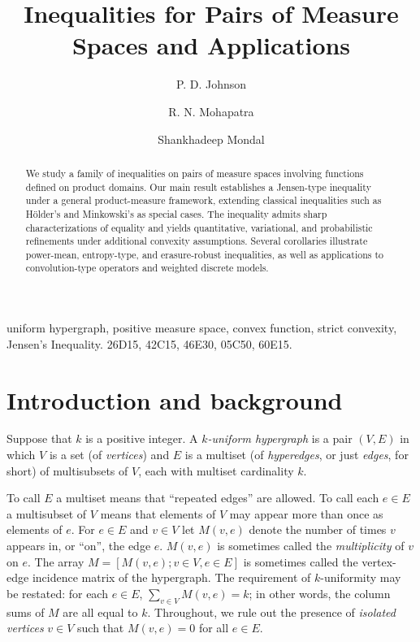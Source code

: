 \documentclass[final,1p,times]{elsarticle}
\begin{document}
\begin{frontmatter}
		\title{ Inequalities for Pairs of Measure Spaces and Applications }
        \author{P. D. Johnson}
		\author{R. N. Mohapatra}
		\author{Shankhadeep Mondal}
		
		
		\address{Department of Mathematics and Statistics, Auburn University, Auburn, AL-36849 }
       \address{School of Mathematics, University of Central Florida, Orlando, Florida-32816}
        \address{School of Mathematics, University of Central Florida, Orlando, Florida-32816}
		
\begin{abstract}
We study a family of inequalities on pairs of measure spaces involving functions defined on product domains. Our main result establishes a Jensen-type inequality under a general product-measure framework, extending classical inequalities such as H\"older’s and Minkowski’s as special cases. The inequality admits sharp characterizations of equality
and yields quantitative, variational, and probabilistic refinements under additional convexity assumptions. Several corollaries illustrate power-mean, entropy-type, and erasure-robust inequalities, as well as applications to convolution-type operators and weighted discrete models.
\end{abstract}


\begin{keyword}
uniform hypergraph, positive measure space, convex function, strict convexity, Jensen's Inequality.
\MSC[2010] 26D15, 42C15, 46E30, 05C50, 60E15.
\end{keyword}

\end{frontmatter}








\section{Introduction and background}

Suppose that $k$ is a positive integer.  A {\em $k$-uniform hypergraph} is a pair $(V, E)$ in which $V$ is a set (of {\em vertices}) and $E$ is a multiset (of {\em hyperedges}, or just {\em edges}, for short) of multisubsets of $V$, each with multiset cardinality $k$.

To call $E$ a multiset means that ``repeated edges'' are allowed.  To call each $e \in E$ a multisubset of $V$ means that elements of $V$ may appear more than once as elements of $e$.  For $e \in E$ and $v \in V$ let $M(v, e)$ denote the number of times $v$ appears in, or ``on'', the edge $e$.  $M(v, e)$ is sometimes called the {\em multiplicity} of $v$ on $e$.  The array $M = [M(v, e); v \in V, e \in E]$ is sometimes called the vertex-edge incidence matrix of the hypergraph.  The requirement of $k$-uniformity may be restated: for each $e \in E$, $\sum _{v \in V} M(v, e) = k$; in other words, the column sums of $M$ are all equal to $k$.  Throughout, we rule out the presence of {\em isolated vertices} $v \in V$ such that $M(v, e) = 0$ for all $e \in E$.
\end{document}
